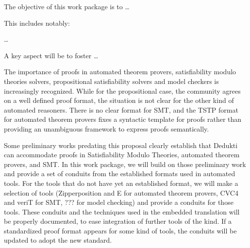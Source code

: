 \begin{workpackage}[id=atpetc,wphases=0-48,type=RTD,
  short=ATPs etc.,%
  title={ATP, SAT, SMT, Model checkers},
  lead=ULi,
  ULiRM=10]
  

\begin{wpobjectives}
  The objective of this work package is to \ldots

This includes notably:
  \begin{compactitem}
  \item \ldots
  \end{compactitem}
  A key aspect will be to foster \ldots
\end{wpobjectives}


\begin{wpdescription}

The importance of proofs in automated theorem provers, satisfiability
modulo theories solvers, propositional satisfiability solvers and
model checkers is increasingly recognized.  While for the
propositional case, the community agrees on a well defined proof
format, the situation is not clear for the other kind of automated
reasoners.  There is no clear format for SMT, and the TSTP format for
automated theorem provers fixes a syntactic template for proofs rather
than providing an unambiguous framework to express proofs
semantically.

Some preliminary works predating this proposal clearly establish that
Dedukti can accommodate proofs in Satisfiability Modulo Theories,
automated theorem provers, and SMT.  In this work package, we will
build on those preliminary work and provide a set of conduits from the
established formats used in automated tools. For the tools that do not
have yet an established format, we will make a selection of tools
(Zipperposition and E for automated theorem provers, CVC4 and veriT
for SMT, ??? for model checking) and provide a conduits for those
tools.  These conduits and the techniques used in the embedded
translation will be properly documented, to ease integration of
further tools of the kind.  If a standardized proof format appears for
some kind of tools, the conduits will be updated to adopt the new
standard.


\end{wpdescription}
\end{workpackage}
